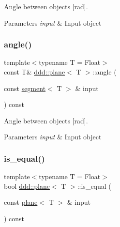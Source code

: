 Angle between objects \mbox{[}rad\mbox{]}. 


\begin{DoxyParams}{Parameters}
{\em input} & Input object \\
\hline
\end{DoxyParams}
\mbox{\label{classddd_1_1plane_a6a9a1c5fb177702ee67e330d803762ab}} 
\subsubsection{\texorpdfstring{angle()}{angle()}\hspace{0.1cm}{\footnotesize\ttfamily [4/4]}}
{\footnotesize\ttfamily template$<$typename T = Float$>$ \\
const T\& \hyperlink{classddd_1_1plane}{ddd\+::plane}$<$ T $>$\+::angle (\begin{DoxyParamCaption}\item[{const \hyperlink{classddd_1_1segment}{segment}$<$ T $>$ \&}]{input }\end{DoxyParamCaption}) const\hspace{0.3cm}{\ttfamily [inline]}}



Angle between objects \mbox{[}rad\mbox{]}. 


\begin{DoxyParams}{Parameters}
{\em input} & Input object \\
\hline
\end{DoxyParams}
\mbox{\label{classddd_1_1plane_aa1bb5a0628b0867a39f9484ec6e1f1df}} 
\subsubsection{\texorpdfstring{is\+\_\+equal()}{is\_equal()}}
{\footnotesize\ttfamily template$<$typename T = Float$>$ \\
bool \hyperlink{classddd_1_1plane}{ddd\+::plane}$<$ T $>$\+::is\+\_\+equal (\begin{DoxyParamCaption}\item[{const \hyperlink{classddd_1_1plane}{plane}$<$ T $>$ \&}]{input }\end{DoxyParamCaption}) const\hspace{0.3cm}{\ttfamily [inline]}}



